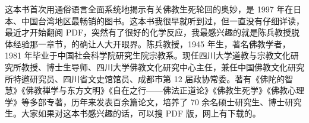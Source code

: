 \begin{book}
    这本书首次用通俗语言全面系统地揭示有关佛教生死轮回的奥妙，是 1997 年在日本、中国台湾地区最畅销的图书。这本书我很早就听到过，但一直没有仔细详读，最近才开始翻阅 PDF，突然有了很好的化学反应，我最感兴趣的就是陈兵教授脱体经验那一章节，的确让人大开眼界。陈兵教授，1945 年生，著名佛教学者，1981 年毕业于中国社会科学院研究生院宗教系。现任四川大学道教与宗教文化研究所教授、博士生导师、四川大学佛教文化研究中心主任，兼任中国佛教文化研究所特邀研究员、四川省文史馆馆员、成都市第 12 届政协常委。著有《佛陀的智慧》《佛教禅学与东方文明》《自在之行——佛法正道论》《佛教生死学》《佛教心理学》等多部专著，历年来发表百余篇论文，培养了 70 余名硕士研究生、博士研究生。大家如果对这本书感兴趣的话，可以搜 PDF 版，网上有下载的。
\end{book}
